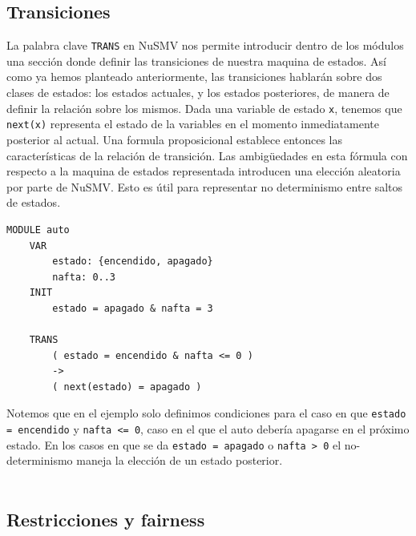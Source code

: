 \documentclass[titlepage, 12pt]{book}
\begin{document}
\subsection*{Transiciones}

La palabra clave \texttt{TRANS} en NuSMV nos permite introducir dentro de los m\'odulos una secci\'on donde definir las transiciones de nuestra maquina de estados. As\'i como ya hemos planteado anteriormente, las transiciones hablar\'an sobre dos clases de estados: los estados actuales, y los estados posteriores, de manera de definir la relaci\'on sobre los mismos. Dada una variable de estado \texttt{x}, tenemos que \texttt{next(x)} representa el estado de la variables en el momento inmediatamente posterior al actual. Una formula proposicional establece entonces las caracter\'isticas de la relaci\'on de transici\'on. Las ambigüedades en esta f\'ormula con respecto a la maquina de estados representada introducen una elecci\'on aleatoria por parte de NuSMV. Esto es \'util para representar no determinismo entre saltos de estados.

\begin{verbatim}
MODULE auto
    VAR
        estado: {encendido, apagado}
        nafta: 0..3
    INIT
        estado = apagado & nafta = 3

    TRANS
        ( estado = encendido & nafta <= 0 ) 
        -> 
        ( next(estado) = apagado )

\end{verbatim}

Notemos que en el ejemplo solo definimos condiciones para el caso en que \texttt{estado = encendido} y \texttt{nafta <= 0}, caso en el que el auto deber\'ia apagarse en el pr\'oximo estado. En los casos en que se da \texttt{estado = apagado} o \texttt{nafta > 0} el no-determinismo maneja la elecci\'on de un estado posterior.\\\\


\subsection*{Restricciones y fairness}
\end{document}
